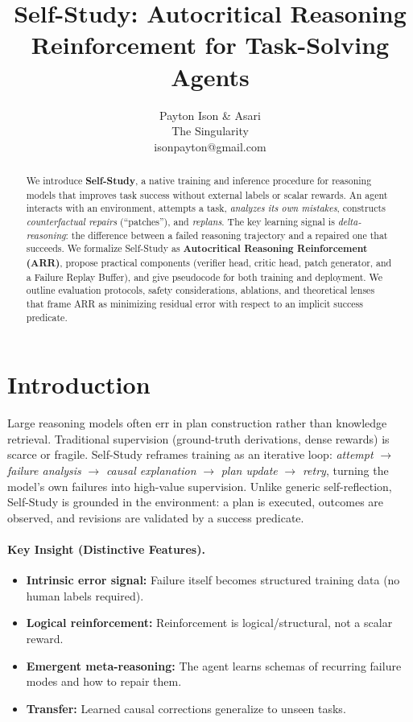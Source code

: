 \documentclass[11pt]{article}
\title{\vspace{-1em}\textbf{Self-Study: Autocritical Reasoning Reinforcement for Task-Solving Agents}}
\author{Payton Ison \& Asari \\ The Singularity \\ isonpayton@gmail.com}
\date{}
\begin{document}
\maketitle

\begin{abstract}
We introduce \textbf{Self-Study}, a native training and inference procedure for reasoning models that improves task success without external labels or scalar rewards. An agent interacts with an environment, attempts a task, \emph{analyzes its own mistakes}, constructs \emph{counterfactual repairs} (``patches''), and \emph{replans}. The key learning signal is \emph{delta-reasoning}: the difference between a failed reasoning trajectory and a repaired one that succeeds. We formalize Self-Study as \textbf{Autocritical Reasoning Reinforcement (ARR)}, propose practical components (verifier head, critic head, patch generator, and a Failure Replay Buffer), and give pseudocode for both training and deployment. We outline evaluation protocols, safety considerations, ablations, and theoretical lenses that frame ARR as minimizing residual error with respect to an implicit success predicate.
\end{abstract}

\section{Introduction}
Large reasoning models often err in plan construction rather than knowledge retrieval. Traditional supervision (ground-truth derivations, dense rewards) is scarce or fragile. Self-Study reframes training as an iterative loop:\; \textit{attempt} $\rightarrow$ \textit{failure analysis} $\rightarrow$ \textit{causal explanation} $\rightarrow$ \textit{plan update} $\rightarrow$ \textit{retry}, turning the model's own failures into high-value supervision. Unlike generic self-reflection, Self-Study is grounded in the environment:\; a plan is executed, outcomes are observed, and revisions are validated by a success predicate.

\paragraph{Key Insight (Distinctive Features).}
\begin{itemize}[leftmargin=1.2em]
    \item \textbf{Intrinsic error signal:} Failure itself becomes structured training data (no human labels required).
    \item \textbf{Logical reinforcement:} Reinforcement is logical/structural, not a scalar reward.
    \item \textbf{Emergent meta-reasoning:} The agent learns schemas of recurring failure modes and how to repair them.
    \item \textbf{Transfer:} Learned causal corrections generalize to unseen tasks.
\end{itemize}
\end{document}
